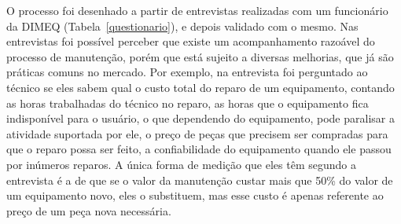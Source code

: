 O processo foi desenhado a partir de entrevistas realizadas com um funcionário da DIMEQ (Tabela~\ref{questionario}), e depois validado com o mesmo. Nas entrevistas foi possível perceber que existe um acompanhamento razoável do processo de manutenção, porém que está sujeito a diversas melhorias, que já são práticas comuns no mercado. Por exemplo, na entrevista foi perguntado ao técnico se eles sabem qual o custo total do reparo de um equipamento, contando as horas trabalhadas do técnico no reparo, as horas que o equipamento fica indisponível para o usuário, o que dependendo do equipamento, pode paralisar a atividade suportada por ele, o preço de peças que precisem ser compradas para que o reparo possa ser feito, a confiabilidade do equipamento quando ele passou por inúmeros reparos. A única forma de medição que eles têm segundo a entrevista é a de que se o valor da manutenção custar mais que 50\% do valor de um equipamento novo, eles o substituem, mas esse custo é apenas referente ao preço de um peça nova necessária. 
                                                             

